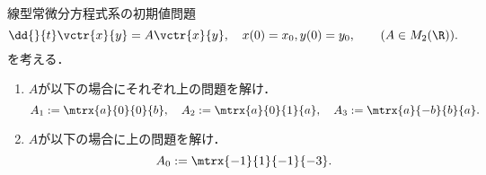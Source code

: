 \documentclass[uplatex,dvipdfmx]{jsarticle}
\begin{document}
\begin{tcolorbox}[colframe=ForestGreen, colback=ForestGreen!10!white,breakable,colbacktitle=ForestGreen!40!white,coltitle=black,fonttitle=\bfseries\sffamily,
    title=第３問]
    \begin{problem}\label{prob-17-8-3}
        線型常微分方程式系の初期値問題
        \[\dd{}{t}\vctr{x}{y}=A\vctr{x}{y},\quad x(0)=x_0,y(0)=y_0,\qquad(A\in M_2(\R)).\]
        を考える．
        \begin{enumerate}[{問}1]
            \item $A$が以下の場合にそれぞれ上の問題を解け．
            \[A_1:=\mtrx{a}{0}{0}{b},\quad A_2:=\mtrx{a}{0}{1}{a},\quad A_3:=\mtrx{a}{-b}{b}{a}.\]
            \item $A$が以下の場合に上の問題を解け．
            \[A_0:=\mtrx{-1}{1}{-1}{-3}.\]
        \end{enumerate}
    \end{problem}
\end{tcolorbox}
\end{document}
